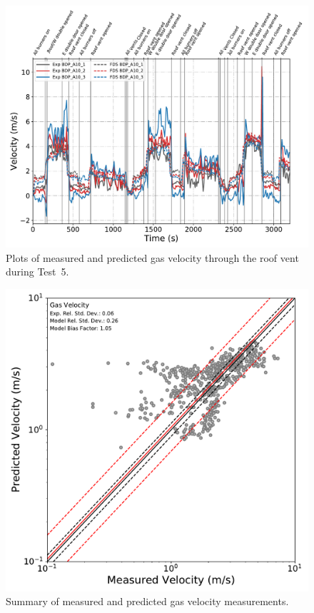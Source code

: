 \begin{figure}[!h]
	\centering
	\includegraphics[width=\columnwidth]{Figures/Plots/Validation/Velocity/Test_5_BDP_A10}
	\caption[Plots of measured and predicted gas velocity through the roof vent during Test~5.]{Plots of measured and predicted gas velocity through the roof vent during Test~5.}
	\label{fig:Test5_BDPs}
\end{figure}

\begin{figure}[!h]
	\centering
	\includegraphics[width=\columnwidth]{Figures/Plots/Validation/Velocity/loglog_BDPs}
	\caption{Summary of measured and predicted gas velocity measurements.}
	\label{fig:loglog_BDPs}
\end{figure}

